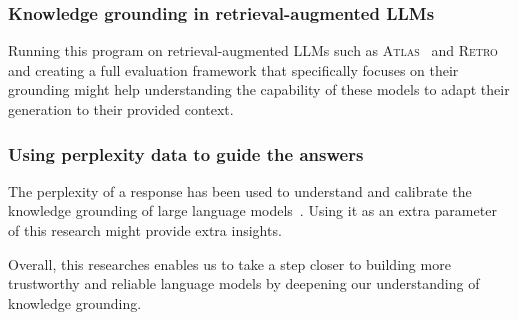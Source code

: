 \subsubsection{Knowledge grounding in retrieval-augmented LLMs}
Running this program on retrieval-augmented LLMs such as \textsc{Atlas}~\cite{atlas_foundational} and \textsc{Retro}~\cite{retro} and creating a full evaluation framework that specifically focuses on their grounding might help understanding the capability of these models to adapt their generation to their provided context.

\subsubsection{Using perplexity data to guide the answers}
The perplexity of a response has been used to understand and calibrate the knowledge grounding of large language models~\cite{how_can_we_know}.
Using it as an extra parameter of this research might provide extra insights.

Overall, this researches enables us to take a step closer to building more trustworthy and reliable language models by deepening our understanding of knowledge grounding.
